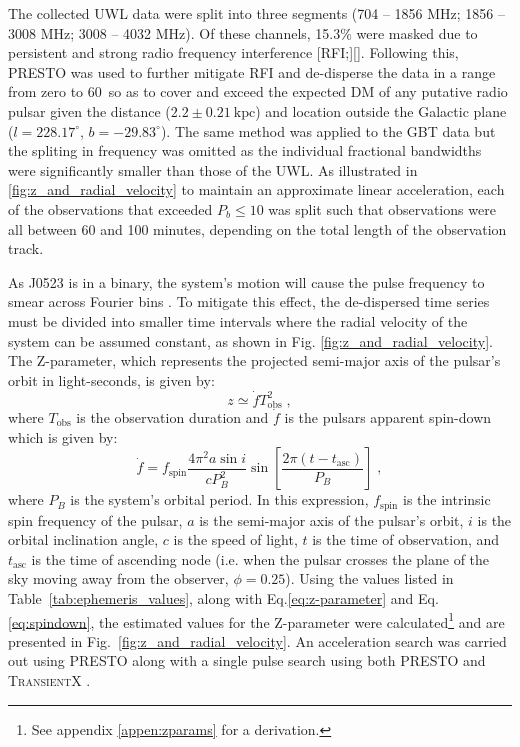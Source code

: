 The collected UWL data were split into three segments (704 -- 1856 MHz; 1856 -- 3008 MHz; 3008 -- 4032 MHz). Of these channels, 15.3\% were masked due to persistent and strong radio frequency interference [RFI;][]\citep{zhou_ultra_wide_2022}. Following this, \textsc{PRESTO} \citep{presto} was used to further mitigate RFI and de-disperse the data in a range from zero to 60~\dm so as to cover and exceed the expected DM of any putative radio pulsar given the distance ($2.2\pm0.21~\text{kpc}$) and location outside the Galactic plane ($l=228.17^\circ$, $b=-29.83^\circ$). The same method was applied to the GBT data but the spliting in frequency was omitted as the individual fractional bandwidths were significantly smaller than those of the UWL.  As illustrated in \cref{fig:z_and_radial_velocity} to maintain an approximate linear acceleration, each of the observations that exceeded $P_b \leq 10$ was split such that observations were all between 60 and 100 minutes, depending on the total length of the observation track. 

As J0523 is in a binary, the system’s motion will cause the pulse frequency to smear across Fourier bins \citep{Ransom-z-2001}. To mitigate this effect, the de-dispersed time series must be divided into smaller time intervals where the radial velocity of the system can be assumed constant, as shown in Fig. \ref{fig:z_and_radial_velocity}. The Z-parameter, which represents the projected semi-major axis of the pulsar's orbit in light-seconds, is given by:
\begin{equation}
    z \simeq \dot f T^2_\text{obs}\;,
    \label{eq:z-parameter}
\end{equation}
where $T_{\text{obs}}$ is the observation duration and $\dot f$ is the pulsars apparent spin-down which is given by: 
\begin{equation}
    \dot f = f_{\text{spin}} \frac{4 \pi^2 a \sin i}{cP^2_B} \sin \left[ \frac{2\pi (t - t_{\text{asc}})}{P_B} \right]\;,
    \label{eq:spindown}
\end{equation}
where $P_B$ is the system’s orbital period. In this expression, $f_{\text{spin}}$ is the intrinsic spin frequency of the pulsar, $a$ is the semi-major axis of the pulsar's orbit, $i$ is the orbital inclination angle, $c$ is the speed of light, $t$ is the time of observation, and $t_{\text{asc}}$ is the time of ascending node (i.e. when the pulsar crosses the plane of the sky moving away from the observer, $\phi=0.25$). Using the values listed in Table~\ref{tab:ephemeris_values}, along with Eq.\ref{eq:z-parameter} and Eq.\ref{eq:spindown}, the estimated values for the Z-parameter were calculated\footnote{See appendix \ref{appen:zparams} for a derivation.} and are presented in Fig.~\ref{fig:z_and_radial_velocity}. An acceleration search was carried out using \textsc{PRESTO} \citep{presto} along with a single pulse search using both \textsc{PRESTO} and \textsc{TransientX} \citep{men_transientx_2024}. 


